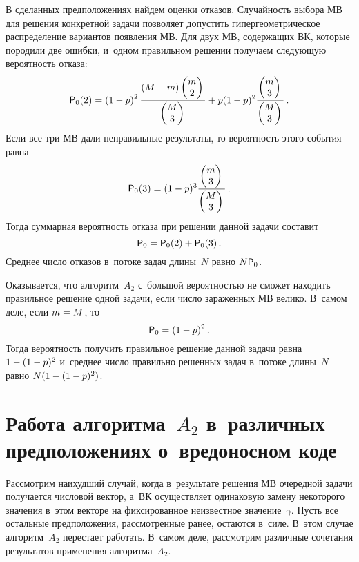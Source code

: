 \begin{multicols}{2}
  В сделанных предположениях найдем оценки отказов. Случайность выбора МВ 
для решения конкретной задачи позволяет допустить гипергеометрическое 
распределение вариантов появления МВ. Для двух МВ, содержащих ВК, которые 
породили две ошибки, и~одном правильном решении получаем следующую 
вероятность отказа:
  $$
{\sf  P}_0(2)=\left(1-p\right)^2 \displaystyle\frac{\displaystyle (M-m)\begin{pmatrix} m\\ 2\end{pmatrix} \mathstrut}{\displaystyle \begin{pmatrix} 
M\\ 3\end{pmatrix}\mathstrut}+p(1-p)^2 \displaystyle\frac{\displaystyle \begin{pmatrix} m \\ 3\end{pmatrix}\mathstrut}{\displaystyle \begin{pmatrix} M\\ 3\end{pmatrix}\mathstrut}\,.
  $$
    Если все три МВ дали неправильные результаты, то вероятность этого события 
равна
  $$
  {\sf P}_0(3)=(1-p)^3 \displaystyle\frac{\displaystyle \begin{pmatrix} m\\ 3\end{pmatrix}\mathstrut}{\displaystyle \begin{pmatrix} M\\ 
3\end{pmatrix}\mathstrut}\,.
  $$
   Тогда суммарная вероятность отказа при решении данной задачи составит
  $$
  {\sf P}_0={\sf P}_0(2)+{\sf P}_0(3)\,.
  $$
    Среднее число отказов в~потоке задач длины~$N$ равно $N{\sf P}_0$.
  
  Оказывается, что алгоритм~$A_2$ с~большой вероятностью не сможет находить 
правильное решение одной задачи, если число зараженных МВ велико. В~самом 
деле, если $m\hm=M$, то
  $$
  {\sf P}_0=(1-p)^2\,.
  $$
    Тогда вероятность получить правильное решение данной задачи равна $1\hm- 
(1\hm- p)^2$ и~среднее число правильно решенных задач в~потоке длины~$N$ 
равно $N(1\hm- (1\hm-p)^2)$. 
  
  \section{Работа алгоритма~$A_2$ в~различных предположениях 
о~вредоносном коде}
  
  Рассмотрим наихудший случай, когда в~результате решения МВ очередной 
задачи получается чис\-ло\-вой вектор, а~ВК осуществляет одинаковую замену 
некоторого значения в~этом векторе на \mbox{фиксированное} неизвестное 
значение~$\gamma$. Пусть все остальные предположения, рассмотренные ранее, 
остаются в~силе. В~этом случае алгоритм~$A_2$ перестает работать. В~самом 
деле, рассмотрим различные сочетания результатов применения 
алгоритма~$A_2$.
  

\end{multicols}
